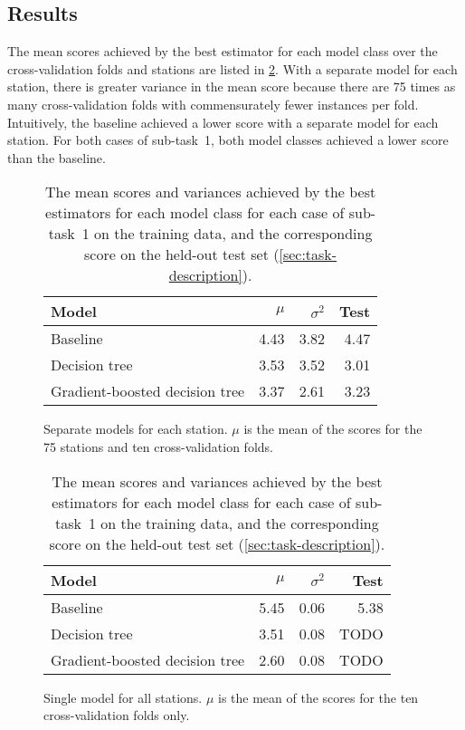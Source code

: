 \documentclass[11pt]{extarticle}
\newcommand{\subfigurespace}{\par\bigskip}
\begin{document}
\subsection{Results}
\label{sec:subtask-1:results}

The mean scores achieved by the best estimator for each model class over the
cross-validation folds and stations are listed in \cref{tab:subtask-1:results}.
With a separate model for each station, there is greater variance in the mean score
because there are 75 times as many cross-validation folds with commensurately fewer
instances per fold.
Intuitively, the baseline achieved a lower score with a separate model for each
station.
For both cases of sub-task~1, both model classes achieved a lower score than the
baseline.

\begin{table}
  \centering
  \begin{subfigure}{\textwidth}
    \centering
    \begin{tabular}{lrrr}
      \toprule
      Model                          & $\mu$ & $\sigma^2$ & Test
      \\
      \midrule
      Baseline                       & 4.43  & 3.82       & 4.47
      \\
      Decision tree                  & 3.53  & 3.52       & 3.01
      \\
      Gradient-boosted decision tree & 3.37  & 2.61       & 3.23
      \\
      \bottomrule
    \end{tabular}
    \caption{Separate models for each station. $\mu$ is the mean of the scores for the 75 stations
      and ten cross-validation folds.}
    \label{tab:subtask-1:results-1}
  \end{subfigure}
  \subfigurespace
  \begin{subfigure}{\textwidth}
    \centering
    \begin{tabular}{lrrr}
      \toprule
      Model                          & $\mu$ & $\sigma^2$ & Test
      \\
      \midrule
      Baseline                       & 5.45  & 0.06       & 5.38
      \\
      Decision tree                  & 3.51  & 0.08       & TODO
      \\
      Gradient-boosted decision tree & 2.60  & 0.08       & TODO
      \\
      \bottomrule
    \end{tabular}
    \caption{Single model for all stations. $\mu$ is the mean of the scores for the ten
      cross-validation folds only.}
    \label{tab:subtask-1:results-2}
  \end{subfigure}
  \caption{The mean scores and variances achieved by the best estimators for each model
    class for each case of sub-task~1 on the training data, and the corresponding score
    on the held-out test set (\cref{sec:task-description}).
  }
  \label{tab:subtask-1:results}
\end{table}
\end{document}
